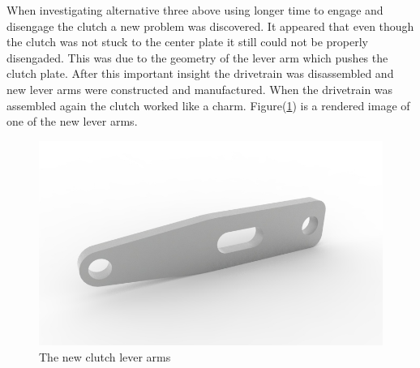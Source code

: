 When investigating alternative three above using longer time to engage and disengage the clutch a new problem was discovered. It appeared that even though the clutch was not stuck to the center plate it still could not be properly disengaded. This was due to the geometry of the lever arm which pushes the clutch plate.  After this important insight the drivetrain was disassembled and new lever arms were constructed and manufactured. When the drivetrain was assembled again the clutch worked like a charm. Figure(\ref{fig:clutch}) is a rendered image of one of the new lever arms.

\begin{figure}[H]
    \centering
    \label{fig:clutch}
    \includegraphics[width=1\textwidth]{./img/clutch}
    \caption{The new clutch lever arms}
\end{figure}

